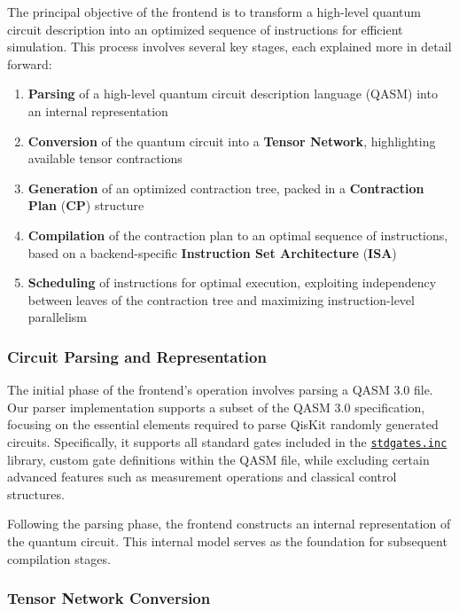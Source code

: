 \documentclass[12pt,oneside,a4paper]{article}
\begin{document}
The principal objective of the frontend is to transform a high-level quantum circuit description into an optimized sequence of instructions for efficient simulation. This process involves several key stages, each explained more in detail forward:

\begin{enumerate}
    \item \textbf{Parsing} of a high-level quantum circuit description language (QASM) into an internal representation
    \item \textbf{Conversion} of the quantum circuit into a \textbf{Tensor Network}, highlighting available tensor contractions
    \item \textbf{Generation} of an optimized contraction tree, packed in a \textbf{Contraction Plan} (\textbf{CP}) structure
    \item \textbf{Compilation} of the contraction plan to an optimal sequence of instructions, based on a backend-specific \textbf{Instruction Set Architecture} (\textbf{ISA})
    \item \textbf{Scheduling} of instructions for optimal execution, exploiting independency between leaves of the contraction tree and maximizing instruction-level parallelism
\end{enumerate}

\subsubsection{Circuit Parsing and Representation}

The initial phase of the frontend's operation involves parsing a QASM 3.0\cite{cross2017openquantumassemblylanguage} file. Our parser implementation supports a subset of the QASM 3.0 specification, focusing on the essential elements required to parse QisKit\cite{qiskit2024} randomly generated circuits. Specifically, it supports all standard gates included in the \href{https://github.com/Qiskit/qiskit/blob/main/qiskit/qasm/libs/stdgates.inc}{\texttt{stdgates.inc}} library, custom gate definitions within the QASM file, while excluding certain advanced features such as measurement operations and classical control structures.

Following the parsing phase, the frontend constructs an internal representation of the quantum circuit. This internal model serves as the foundation for subsequent compilation stages.

\subsubsection{Tensor Network Conversion}
\end{document}
